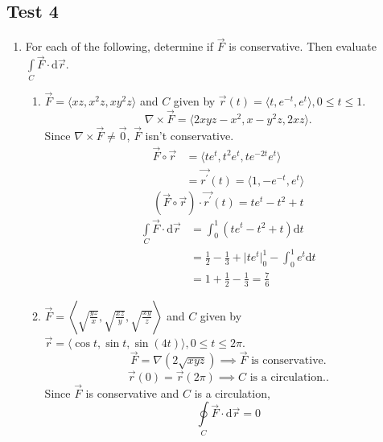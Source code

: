 \subsection{Test 4}
\begin{enumerate}
	\item For each of the following, determine if $\vec{F}$ is conservative. Then evaluate $\int\limits_{C}{\vec{F}\cdot\mathrm{d}\vec{r}}$.
	\begin{enumerate}[label=\alph*.]
		\item $\vec{F} = \langle xz, x^2z, xy^2z \rangle$ and $C$ given by $\vec{r}(t) = \langle t, e^{-t}, e^t\rangle, 0 \leq t \leq 1$.
		\begin{equation*}
			\nabla \times \vec{F} = \langle 2xyz-x^2, x-y^2z, 2xz \rangle.
		\end{equation*}
		Since $\nabla \times \vec{F} \neq \vec{0}$, $\vec{F}$ isn't conservative.
		\begin{align*}
			\vec{F}\circ\vec{r} &= \langle te^t, t^2e^t, te^{-2t}e^t \rangle \\
			&= \vec{r^\prime}(t) = \langle 1, -e^{-t}, e^t\rangle
		\end{align*}
		\begin{equation*}
			\left(\vec{F}\circ\vec{r}\right) \cdot \vec{r^\prime}(t) = te^t - t^2 + t
		\end{equation*}
		\begin{align*}
			\int\limits_{C}{\vec{F} \cdot \mathrm{d}\vec{r}} &= \int_{0}^{1}{\left(te^t - t^2 + t\right)\mathrm{d}t} \\
			&= \frac{1}{2} - \frac{1}{3} + \lvert te^t\rvert_{0}^{1} - \int_{0}^{1}{e^t\mathrm{d}t} \\
			&= 1 + \frac{1}{2} - \frac{1}{3} = \frac{7}{6}
		\end{align*}
		
		\item $\vec{F} = \left< \sqrt{\frac{yz}{x}}, \sqrt{\frac{xz}{y}}, \sqrt{\frac{xy}{z}} \right>$ and $C$ given by $\vec{r} = \langle \cos{t}, \sin{t}, \sin{(4t)} \rangle, 0 \leq t \leq 2\pi$.
		\begin{equation*}
			\vec{F} = \nabla(2\sqrt{xyz}) \implies \vec{F}  \text{ is conservative.}
		\end{equation*}
		\begin{equation*}
			\vec{r}(0) = \vec{r}(2\pi) \implies C \text{ is a circulation.}.
		\end{equation*}
		Since $\vec{F}$ is conservative and $C$ is a circulation,
		\begin{equation*}
			\oint\limits_{C}{\vec{F} \cdot \mathrm{d}\vec{r}} = 0
		\end{equation*}
		

\end{enumerate}
\end{enumerate}
